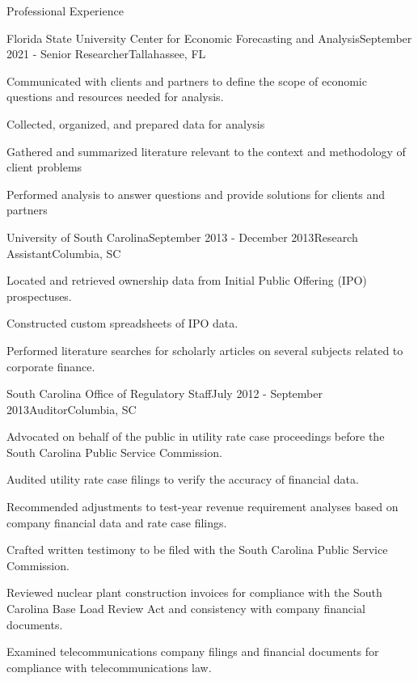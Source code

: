 \documentclass{resume} %
\begin{document}
\begin{rSection}{Professional Experience}
    

\begin{rSubsection}{Florida State University Center for Economic Forecasting and Analysis}{September 2021 - }{Senior Researcher}{Tallahassee, FL}
	\item Communicated with clients and partners to define the scope of economic questions  and resources needed for analysis.
	\item Collected, organized, and prepared data for analysis
	\item Gathered and summarized literature relevant to the context and methodology of client problems
	\item Performed analysis to answer questions and provide solutions for clients and partners
\end{rSubsection}


\begin{rSubsection}{University of South Carolina}{September 2013 - December 2013}{Research Assistant}{Columbia, SC}
    \item Located and retrieved ownership data from Initial Public Offering (IPO) prospectuses.
    \item Constructed custom spreadsheets of IPO data.
    \item Performed literature searches for scholarly articles on several subjects related to corporate finance.
\end{rSubsection}

\begin{rSubsection}{South Carolina Office of Regulatory Staff}{July 2012 - September 2013}{Auditor}{Columbia, SC}
    \item Advocated on behalf of the public in utility rate case proceedings before the South Carolina Public Service Commission.
    \item Audited utility rate case filings to verify the accuracy of financial data.
    \item Recommended adjustments to test-year revenue requirement analyses based on company financial data and rate case filings.
    \item Crafted written testimony to be filed with the South Carolina Public Service Commission.
    \item Reviewed nuclear plant construction invoices for compliance with the South Carolina Base Load Review Act and consistency with company financial documents.
    \item Examined telecommunications company filings and financial documents for compliance with telecommunications law.


\end{rSubsection}
\end{rSection}
\end{document}
